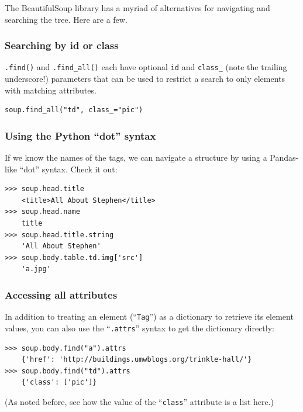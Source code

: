 The BeautifulSoup library has a myriad of alternatives for navigating and
searching the tree. Here are a few.

\subsubsection{Searching by id or class}

\texttt{.find()} and \texttt{.find\_all()} each have optional \texttt{id} and
\texttt{class\_} (note the trailing underscore!) parameters that can be used
to restrict a search to only elements with matching attributes.

\begin{Verbatim}[fontsize=\footnotesize,samepage=true,frame=single]
soup.find_all("td", class_="pic")
\end{Verbatim}

\subsubsection{Using the Python ``dot'' syntax}

If we know the names of the tags, we can navigate a structure by using a
Pandas-like ``dot'' syntax. Check it out:

\begin{Verbatim}[fontsize=\footnotesize,samepage=true,frame=single]
>>> soup.head.title
    <title>All About Stephen</title>
>>> soup.head.name
    title
>>> soup.head.title.string
    'All About Stephen'
>>> soup.body.table.td.img['src']
    'a.jpg'
\end{Verbatim}

\subsubsection{Accessing all attributes}

In addition to treating an element (``\texttt{Tag}'') as a dictionary to
retrieve its element values, you can also use the ``\texttt{.attrs}'' syntax to
get the dictionary directly:

\begin{Verbatim}[fontsize=\footnotesize,samepage=true,frame=single]
>>> soup.body.find("a").attrs
    {'href': 'http://buildings.umwblogs.org/trinkle-hall/'}
>>> soup.body.find("td").attrs
    {'class': ['pic']}
\end{Verbatim}

(As noted before, see how the value of the ``\texttt{class}'' attribute is a
list here.)

